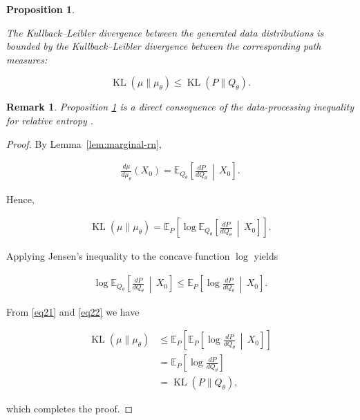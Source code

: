 \documentclass[11pt]{article}
\newtheorem{proposition}{Proposition}
\newtheorem{remark}{Remark}
\DeclareMathOperator{\KL}{KL}
\begin{document}
\begin{proposition} 
\label{prop:dpi}

The Kullback--Leibler divergence between the generated data distributions is
bounded by the Kullback--Leibler divergence between the corresponding path
measures:

\[
\boxed{
\KL(\mu\|\mu_\theta)
\le
\KL(P\|Q_\theta).
}
\]

\end{proposition}
\begin{remark}
Proposition \ref{prop:dpi} is a direct consequence of the data-processing inequality for relative entropy \cite{CoverThomas2006}.
\end{remark}
\begin{proof}

By Lemma~\ref{lem:marginal-rn},

\begin{align}
\frac{d\mu}{d\mu_\theta}(X_0)
=
\mathbb E_{Q_\theta}
\left[
\frac{dP}{dQ_\theta}
\,\middle|\,
X_0
\right].
\end{align}

Hence,

\begin{align}
\KL(\mu\|\mu_\theta)
=
\mathbb E_P
\left[
\log
\mathbb E_{Q_\theta}
\left[
\frac{dP}{dQ_\theta}
\,\middle|\,
X_0
\right]
\right]. \label{eq21}
\end{align}

Applying Jensen's inequality to the concave function $\log$ yields

\begin{align}
\log
\mathbb E_{Q_\theta}
\left[
\frac{dP}{dQ_\theta}
\,\middle|\,
X_0
\right]
\le
\mathbb E_P
\left[
\log
\frac{dP}{dQ_\theta}
\,\middle|\,
X_0
\right]. \label{eq22}
\end{align}

From \eqref{eq21} and \eqref{eq22} we have


\begin{align}
\KL(\mu\|\mu_\theta)
&\le
\mathbb E_P
\left[
\mathbb E_P
\left[
\log
\frac{dP}{dQ_\theta}
\,\middle|\,
X_0
\right]
\right]
 \nonumber \\
&=
\mathbb E_P
\left[
\log
\frac{dP}{dQ_\theta}
\right]
\nonumber \\
&=
\KL(P\|Q_\theta),
\end{align}


which completes the proof.

\end{proof}
\end{document}
